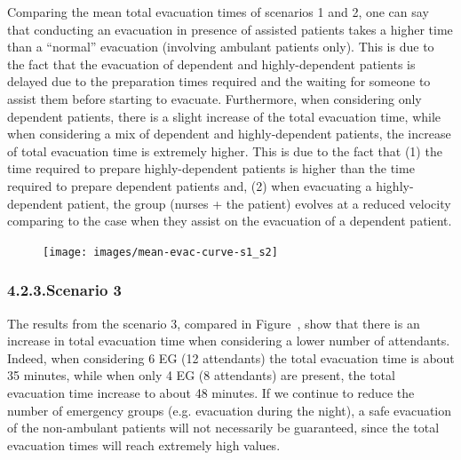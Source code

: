 \documentclass{style/llncs}
\begin{document}
Comparing the mean total evacuation times of scenarios 1 and 2, one can
say that conducting an evacuation in presence of assisted patients
takes a higher time than a \textquotedblleft{}normal\textquotedblright{} evacuation (involving ambulant patients only). This is due to the fact
that the evacuation of dependent and highly-dependent patients is delayed
due to the preparation times required and the waiting for someone to assist them before starting to evacuate.
Furthermore, when considering only dependent patients, there is a slight increase of the total evacuation time, while when considering a mix of dependent and highly-dependent patients, the increase of total evacuation time is extremely higher. This is due to the fact that (1) the time required to prepare highly-dependent patients is higher than the time required to prepare dependent patients and, (2) when evacuating a highly-dependent patient, the group (nurses + the patient) evolves at a reduced velocity comparing to the case when they assist on the evacuation of a dependent patient.%

\begin{figure}[tbp]%
\begin{mdcenter}%

\noindent{}\texttt{[image: images/mean-evac-curve-s1\_s2]}{}%

\mdhr{}%

\noindent{}%
\end{mdcenter}\label{mean-evac-curve_s1-s2}%
\end{figure}%

\subsubsection{4.2.3.\hspace*{0.5em}Scenario 3}\label{path-s3}%

\noindent{}The results from the scenario 3, compared in Figure~, show that there is an 
increase in total evacuation time when considering a lower number of 
attendants. Indeed, when considering 6 EG (12 attendants) the total 
evacuation time is about 35 minutes, while when only 4 EG (8 attendants) 
are present, the total evacuation time increase to about 48 minutes. 
If we continue to reduce the number of emergency groups (e.g. evacuation
 during the night), a safe evacuation of the non-ambulant patients will 
 not necessarily be guaranteed, since the total evacuation times will reach
  extremely high values.%
\end{document}
